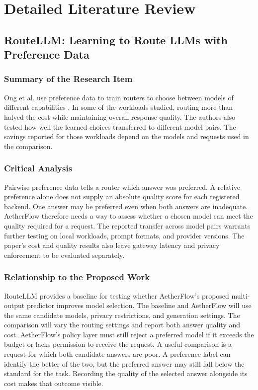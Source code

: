 \documentclass{FastFyp}
\begin{document}
\section{Detailed Literature Review}
\subsection{RouteLLM: Learning to Route LLMs with Preference Data}
\subsubsection{Summary of the Research Item}
Ong et al. use preference data to train routers to choose between models of different capabilities \cite{ref:RouteLLM}. In some of the workloads studied, routing more than halved the cost while maintaining overall response quality. The authors also tested how well the learned choices transferred to different model pairs. The savings reported for those workloads depend on the models and requests used in the comparison.

\subsubsection{Critical Analysis}
Pairwise preference data tells a router which answer was preferred. A relative preference alone does not supply an absolute quality score for each registered backend. One answer may be preferred even when both answers are inadequate. AetherFlow therefore needs a way to assess whether a chosen model can meet the quality required for a request. The reported transfer across model pairs warrants further testing on local workloads, prompt formats, and provider versions. The paper's cost and quality results also leave gateway latency and privacy enforcement to be evaluated separately.

\subsubsection{Relationship to the Proposed Work}
RouteLLM provides a baseline for testing whether AetherFlow's proposed multi-output predictor improves model selection. The baseline and AetherFlow will use the same candidate models, privacy restrictions, and generation settings. The comparison will vary the routing settings and report both answer quality and cost. AetherFlow's policy layer must still reject a preferred model if it exceeds the budget or lacks permission to receive the request. A useful comparison is a request for which both candidate answers are poor. A preference label can identify the better of the two, but the preferred answer may still fall below the standard for the task. Recording the quality of the selected answer alongside its cost makes that outcome visible.
\end{document}
